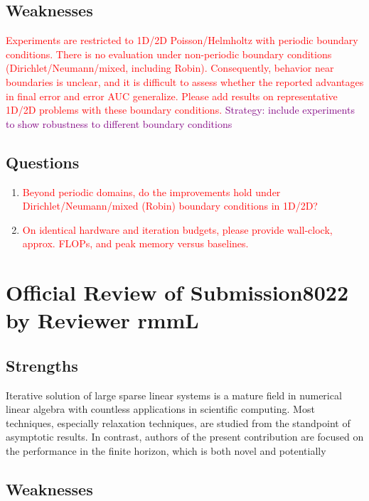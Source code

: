 \documentclass[12pt]{article}
\begin{document}
\subsection*{Weaknesses}

\textcolor{red}{Experiments are restricted to 1D/2D Poisson/Helmholtz with periodic boundary conditions. There is no evaluation under non-periodic boundary conditions (Dirichlet/Neumann/mixed, including Robin). Consequently, behavior near boundaries is unclear, and it is difficult to assess whether the reported advantages in final error and error AUC generalize. Please add results on representative 1D/2D problems with these boundary conditions.}
\textcolor{purple}{Strategy: include experiments to show robustness to different boundary conditions}

\subsection*{Questions}

\begin{enumerate}
    \item \textcolor{red}{Beyond periodic domains, do the improvements hold under Dirichlet/Neumann/mixed (Robin) boundary conditions in 1D/2D?}
    \item \textcolor{red}{On identical hardware and iteration budgets, please provide wall-clock, approx. FLOPs, and peak memory versus baselines.}
\end{enumerate}

\section{Official Review of Submission8022 by Reviewer rmmL}

\subsection*{Strengths}
Iterative solution of large sparse linear systems is a mature field in numerical linear algebra with countless applications in scientific computing. Most techniques, especially relaxation techniques, are studied from the standpoint of asymptotic results. In contrast, authors of the present contribution are focused on the performance in the finite horizon, which is both novel and potentially

\subsection*{Weaknesses}
\end{document}
